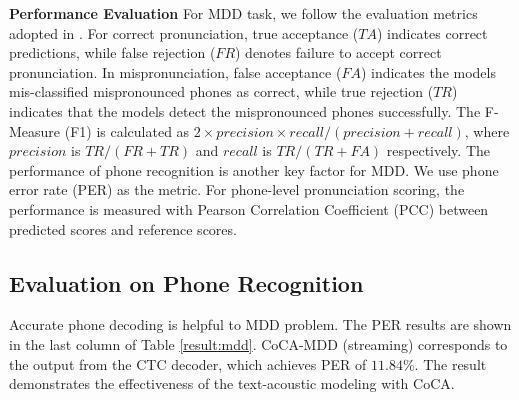 \documentclass[a4paper]{article}
\begin{document}
\noindent \textbf{Performance Evaluation}
For MDD task, we follow the evaluation metrics adopted in \cite{fu2021full,peng2021study,leung2019cnn,zhang2021text}. For correct pronunciation, true acceptance ($TA$) indicates correct predictions, while false rejection ($FR$) denotes failure to accept correct pronunciation. In mispronunciation, false acceptance ($FA$) indicates the models mis-classified mispronounced phones as correct, while true rejection ($TR$) indicates that the models detect the mispronounced phones successfully. The F-Measure (F1) is calculated as $2\times precision \times recall / (precision + recall)$, where $precision$ is $TR/(FR+TR)$ and $recall$ is $TR/(TR+FA)$ respectively. The performance of phone recognition is another key factor for MDD. We use phone error rate (PER) as the metric. For phone-level pronunciation scoring, the performance is measured with Pearson Correlation Coefficient (PCC) between predicted scores and reference scores. 

\subsection{Evaluation on Phone Recognition}
Accurate phone decoding is helpful to MDD problem.
The PER results are shown in the last column of Table \ref{result:mdd}. CoCA-MDD (streaming) corresponds to the output from the CTC decoder, which achieves PER of $11.84\%$. 
The result demonstrates the effectiveness of the text-acoustic modeling with CoCA. %

\end{document}
